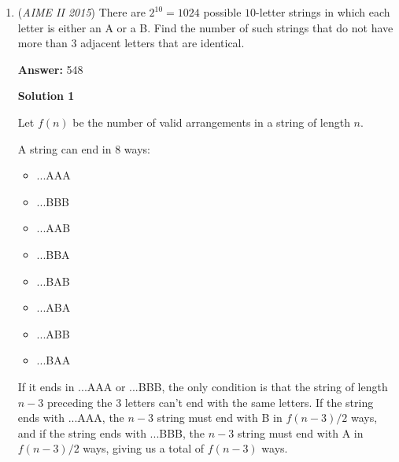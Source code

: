 \begin{enumerate}
 Plugging equation $(1)$ into equation $(2)$ gives $2.25+2b^2=20.25$, or $b^2=9$. Thus $b=3$ (as lengths are positive).Plugging this back in equation $(1)$ gives 
 \[a^2+6a=2.25 \Rightarrow a^2+6a-2.25=0 \Rightarrow 4a^2+24a-9=0.\]The quadratic equation yields 
 \[a=\frac{-24\pm \sqrt{24^2-4(4)(-9)}}{8}=\frac{-24 \pm \sqrt{720}}{8}=\frac{-24 \pm 12\sqrt{5}}{8}=\frac{-6 \pm 3\sqrt{5}}{2}.\] Since lengths are positive, $a=\frac{3\sqrt{5}-6}{2}$.

 Apply PoP on $P$ with respect to $\omega$ to get 
 \[PY \cdot PX = PB \cdot PA = PB(5-PB) \Rightarrow PY\cdot PX = (YO-PO)(XO+PO) = (b-PO)(b+PO) = 9-PO^2 = PB(5-PB).\] Subtracting $9$ from both sides, we obtain 
 \[9-PO^2-9=PB(5-PB)-9 \Rightarrow 18-(PO^2+9)=PB(5-PB) \Rightarrow 18-(PO^2+BO^2)=PB(5-PB).\] Because $\angle POB = 90^\circ$, we have $PO^2+OB^2=PB^2$. Therefore, 
 \[18-PB^2=5PB-PB^2 \Rightarrow 18=5PB \Rightarrow PB=\frac{18}{5} \Rightarrow \boxed{23}.\]



	\item (\textit{AIME II 2015}) There are $2^{10} = 1024$ possible $10$-letter strings in which each letter is either an A or a B. Find the number of such strings that do not have more than $3$ adjacent letters that are identical.


 
 \textbf{Answer: }548



\textbf{Solution 1}

Let $f(n)$ be the number of valid arrangements in a string of length $n$.

 A string can end in 8 ways:

 
            \begin{itemize}
        \item ...AAA
        \item ...BBB
        \item ...AAB
        \item ...BBA
        \item ...BAB
        \item ...ABA
        \item ...ABB
        \item ...BAA
            \end{itemize}
            
If it ends in ...AAA or ...BBB, the only condition is that the string of length $n-3$ preceding the 3 letters can't end with the same letters. If the string ends with ...AAA, the $n-3$ string must end with B in $f(n-3)/2$ ways, and if the string ends with ...BBB, the $n-3$ string must end with A in $f(n-3)/2$ ways, giving us a total of $f(n-3)$ ways.


\end{enumerate}
